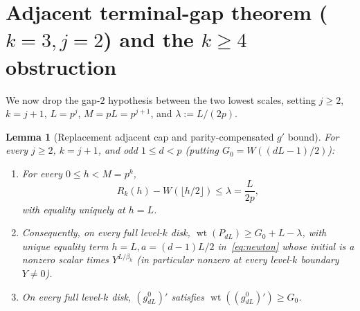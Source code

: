 \documentclass[11pt,reqno]{amsart}
\numberwithin{equation}{section}
\newtheorem{lemma}[theorem]{Lemma}
\theoremstyle{definition}
\theoremstyle{remark}
\newcommand{\wt}{\operatorname{wt}}
\begin{document}
\section{Adjacent terminal-gap theorem ($k=3,j=2$) and the $k\ge 4$ obstruction}
\label{sec:adjacent}

We now drop the gap-$2$ hypothesis between the two lowest scales, setting $j\ge 2$, $k=j+1$, $L=p^j$, $M=pL=p^{j+1}$, and $\lambda := L/(2p)$.

\begin{lemma}[Replacement adjacent cap and parity-compensated $g'$ bound]
\label{lem:adjacent-cap}
For every $j\ge 2$, $k=j+1$, and odd $1\le d<p$ (putting $G_0 = W((dL-1)/2)$):
\begin{enumerate}[label=(\alph*),leftmargin=2em]
\item For every $0\le h < M=p^k$,
\begin{equation}
\label{eq:adj-cap}
R_k(h) - W(\lfloor h/2\rfloor) \le \lambda = \frac{L}{2p},
\end{equation}
with equality \emph{uniquely} at $h=L$.
\item Consequently, on every full level-$k$ disk, $\wt(P_{dL}) \ge G_0 + L - \lambda$, with unique equality term $h=L, a=(d-1)L/2$ in~\eqref{eq:newton} whose initial is a nonzero scalar times $Y^{L/\beta_k}$ (in particular nonzero at every level-$k$ boundary $Y\ne 0$).
\item On every full level-$k$ disk, $(g_{dL}^0)'$ satisfies $\wt((g_{dL}^0)') \ge G_0$.
\end{enumerate}
\end{lemma}
\end{document}
